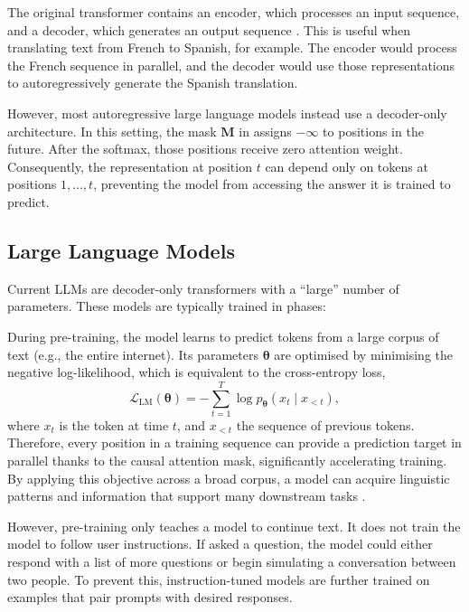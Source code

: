 The original transformer contains an encoder, which processes an input sequence, and a decoder, which generates an output sequence \citep{vaswani2017attention}. This is useful when translating text from French to Spanish, for example. The encoder would process the French sequence in parallel, and the decoder would use those representations to autoregressively generate the Spanish translation. 

However, most autoregressive large language models instead use a decoder-only architecture. In this setting, the mask $\mathbf{M}$ in  assigns $-\infty$ to positions in the future. After the softmax, those positions receive zero attention weight. Consequently, the representation at position $t$ can depend only on tokens at positions $1,\ldots,t$, preventing the model from accessing the answer it is trained to predict.

\subsection{Large Language Models}
\label{sec:large_language_models}
Current LLMs are decoder-only transformers with a ``large'' number of parameters. These models are typically trained in phases:

During pre-training, the model learns to predict tokens from a large corpus of text (e.g., the entire internet). Its parameters $\boldsymbol{\theta}$ are optimised by minimising the negative log-likelihood, which is equivalent to the cross-entropy loss,
\begin{equation}
    \mathcal{L}_{\mathrm{LM}}(\boldsymbol{\theta})
    = -\sum_{t=1}^{T}
      \log p_{\boldsymbol{\theta}}(x_t \mid x_{<t}),
    \label{eq:language_model_loss}
\end{equation}
where $x_t$ is the token at time $t$, and $x_{<t}$ the sequence of previous tokens. Therefore, every position in a training sequence can provide a prediction target in parallel thanks to the causal attention mask, significantly accelerating training. By applying this objective across a broad corpus, a model can acquire linguistic patterns and information that support many downstream tasks \citep{brown2020language_models}.

However, pre-training only teaches a model to continue text. It does not train the model to follow user instructions. If asked a question, the model could either respond with a list of more questions or begin simulating a conversation between two people. To prevent this, instruction-tuned models are further trained on examples that pair prompts with desired responses.

